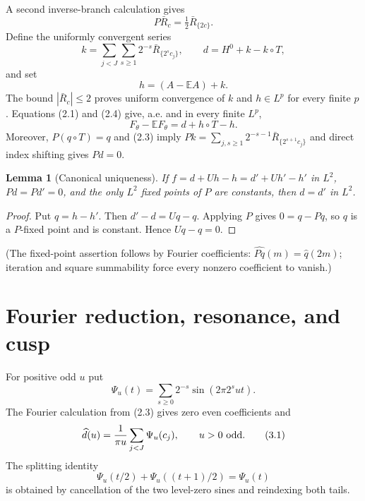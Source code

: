 \documentclass[11pt]{article}
\numberwithin{equation}{section}
\newtheorem{lemma}[theorem]{Lemma}
\newcommand{\E}{\mathbb E}\newcommand{\Pp}{\mathbb P}
\newcommand{\1}{\mathbf 1}\newcommand{\F}{\mathcal F}\newcommand{\D}{\mathcal D}
\begin{document}
A second inverse-branch calculation gives
\begin{equation}P\bar R_c=\tfrac12\bar R_{\{2c\}}.             \tag{2.3}\end{equation}
Define the uniformly convergent series
\[
 k=\sum_{j<J}\sum_{s\geq1}2^{-s}\bar R_{\{2^sc_j\}},\qquad
 d=H^0+k-k\circ T,
\]
and set
\begin{equation}h=(A-\E A)+k.                                  \tag{2.4}\end{equation}
The bound $|\bar R_c|\leq2$ proves uniform convergence of $k$ and
$h\in L^p$ for every finite $p$.  Equations (2.1) and (2.4) give, a.e. and
in every finite $L^p$,
\begin{equation}F_\theta-\E F_\theta=d+h\circ T-h.             \tag{2.5}\end{equation}
Moreover, $P(q\circ T)=q$ and (2.3) imply $Pk=\sum_{j,s\geq1}
2^{-s-1}\bar R_{\{2^{s+1}c_j\}}$ and direct index shifting gives $Pd=0$.

\begin{lemma}[Canonical uniqueness]
If $f=d+Uh-h=d'+Uh'-h'$ in $L^2$, $Pd=Pd'=0$, and the only $L^2$ fixed
points of $P$ are constants, then $d=d'$ in $L^2$.
\end{lemma}
\begin{proof}
Put $q=h-h'$.  Then $d'-d=Uq-q$.  Applying $P$ gives $0=q-Pq$, so $q$ is a
$P$-fixed point and is constant.  Hence $Uq-q=0$.
\end{proof}
(The fixed-point assertion follows by Fourier coefficients:
$\widehat{Pq}(m)=\widehat q(2m)$; iteration and square summability force every
nonzero coefficient to vanish.)

\section{Fourier reduction, resonance, and cusp}
For positive odd $u$ put
\[
 \Psi_u(t)=\sum_{s\geq0}2^{-s}\sin(2\pi2^sut).
\]
The Fourier calculation from (2.3) gives zero even coefficients and
\begin{equation}
 \widehat d(u)={1\over\pi u}\sum_{j<J}\Psi_u(c_j),\qquad u>0\text{ odd}. \tag{3.1}
\end{equation}
The splitting identity
\[
 \Psi_u(t/2)+\Psi_u((t+1)/2)=\Psi_u(t)                          \tag{3.2}
\]
is obtained by cancellation of the two level-zero sines and reindexing both
tails.
\end{document}
